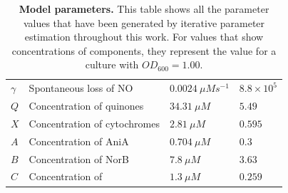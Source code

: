 \begin{table}[tbp]
\begin{center}
\begin{tabular}{>{\centering}m{1.4cm}>{\centering}m{6.1cm}>{\centering}m{2.7cm}>{\centering}m{2.5cm}}
$\gamma$ & Spontaneous loss of NO & $0.0024~\mu Ms^{-1}$ & $8.8\times10^5$
\tabularnewline\noalign{\smallskip}\hline\noalign{\smallskip}

$Q$ & Concentration of quinones & $34.31~\mu M$ & $5.49$
\tabularnewline\noalign{\smallskip}\hline\noalign{\smallskip}

$X$ & Concentration of cytochromes & $2.81~\mu M$ & $0.595$
\tabularnewline\noalign{\smallskip}\hline\noalign{\smallskip}

$A$ & Concentration of AniA & $0.704~\mu M$ & $0.3$
\tabularnewline\noalign{\smallskip}\hline\noalign{\smallskip}

$B$ & Concentration of NorB & $7.8~\mu M$ & $3.63$
\tabularnewline\noalign{\smallskip}\hline\noalign{\smallskip}

$C$ & Concentration of \cbbthree{} & $1.3~\mu M$ & $0.259$
\tabularnewline
\bottomrule
\end{tabular}
\caption[Model parameters]{{\bf Model parameters.} This table shows all the parameter values that have been generated by iterative parameter estimation throughout this work. For values that show concentrations of components, they represent the value for a culture with $OD_{600}=1.00$.
\label{tab:final_parameters}}
\end{center}
\end{table}

